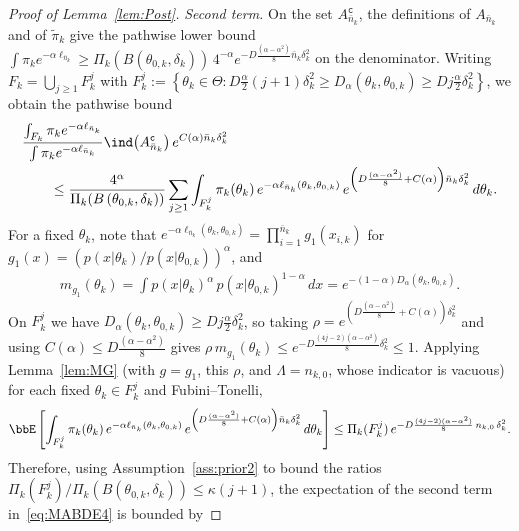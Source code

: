 \documentclass[11pt]{article}
\begin{document}
\begin{proof}[Proof of Lemma~\ref{lem:Post}]
\emph{Second term.} On the set $A_{\bar n_k}^\mathtt{c}$, the definitions of $A_{\bar n_k}$ and of $\tilde \pi_k$ give the pathwise lower bound $\int \pi_k e^{-\alpha \ell_{\bar n_k}} \geq \Pi_k(B\left(\theta_{0,k},\delta_k \right))\, 4^{-\alpha} e^{-D \frac{(\alpha-\alpha^2)}{8} \bar n_k \delta_k^2}$ on the denominator. Writing $F_k= \bigcup_{j\geq 1} F_k^j$ with $F_k^j := \left\{\theta_k \in \Theta: D\frac{\alpha}{2} (j+1) \delta_k^2 \geq D_{\alpha}(\theta_k,\theta_{0,k}) \geq D j \frac{\alpha}{2} \delta_k^2  \right\}$, we obtain the pathwise bound
\begin{align}
    &\frac{\int_{F_k} \pi_k e^{-\alpha \ell_{\bar n_k}}} {\int \pi_k e^{-\alpha \ell_{\bar n_k}} } \ind\big(A_{\bar n_k}^\mathtt{c}\big)\, e^{C(\alpha) \bar n_k \delta_k^2} \nonumber \\
    &\qquad \leq \frac{4^{\alpha}}{\Pi_k(B\left(\theta_{0,k},\delta_k \right))} \sum_{j \geq 1} \int_{F_k^j} \pi_k(\theta_k)\, e^{-\alpha \ell_{\bar n_k}(\theta_k,\theta_{0,k})}\, e^{\left(D \frac{(\alpha-\alpha^2)}{8} + C(\alpha)\right) \bar n_k \delta_k^2}\, d\theta_k.
    \label{eq:MABDE6}
\end{align}
For a fixed $\theta_k$, note that $e^{-\alpha \ell_{\bar n_k}(\theta_k,\theta_{0,k})} = \prod_{i=1}^{\bar n_k} g_1(x_{i,k})$ for $g_1(x) = \left( p(x|\theta_k)/p(x|\theta_{0,k})\right)^{\alpha}$, and
\begin{align}
    m_{g_1}(\theta_k) = \int p(x|\theta_k)^{\alpha}\, p(x|\theta_{0,k})^{1-\alpha}\, dx = e^{-(1-\alpha) D_{\alpha}(\theta_k,\theta_{0,k})}.
    \label{eq:Iden1}
\end{align}
On $F_k^j$ we have $D_{\alpha}(\theta_k,\theta_{0,k}) \geq D j \frac{\alpha}{2}\delta_k^2$, so taking $\rho = e^{\left(D\frac{(\alpha-\alpha^2)}{8} + C(\alpha)\right)\delta_k^2}$ and using $C(\alpha) \leq D\frac{(\alpha-\alpha^2)}{8}$ gives $\rho\, m_{g_1}(\theta_k) \leq e^{-D \frac{(4j-2)(\alpha-\alpha^2)}{8}\delta_k^2} \leq 1$. Applying Lemma~\ref{lem:MG} (with $g = g_1$, this $\rho$, and $\Lambda = n_{k,0}$, whose indicator is vacuous) for each fixed $\theta_k \in F_k^j$ and Fubini--Tonelli,
\begin{align}
    \bbE\left[ \int_{F_k^j} \pi_k(\theta_k)\, e^{-\alpha \ell_{\bar n_k}(\theta_k,\theta_{0,k})}\, e^{\left(D \frac{(\alpha-\alpha^2)}{8} + C(\alpha)\right) \bar n_k \delta_k^2}\, d\theta_k\right] \leq \Pi_k(F_k^j)\, e^{-D \frac{(4j-2)(\alpha-\alpha^2)}{8}\, n_{k,0}\, \delta_k^2 }.
    \label{eq:MABDE6.5}
\end{align}
Therefore, using Assumption~\ref{ass:prior2} to bound the ratios $\Pi_k(F_k^j)/\Pi_k(B\left(\theta_{0,k},\delta_k \right)) \leq \kappa (j+1)$, the expectation of the second term in~\eqref{eq:MABDE4} is bounded by

\end{proof}
\end{document}
